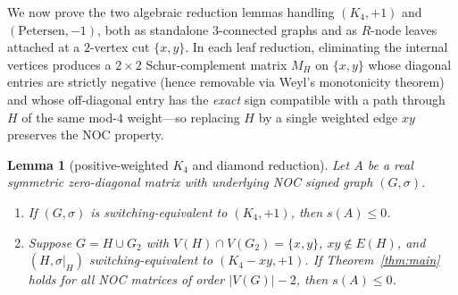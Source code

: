 \documentclass[10pt,letterpaper]{article}
\theoremstyle{zetaplain}
\newtheorem{lemma}[theorem]{Lemma}
\theoremstyle{zetadef}
\theoremstyle{remark}
\numberwithin{equation}{section}
\begin{document}
We now prove the two algebraic reduction lemmas handling $(K_4, +1)$ and $(\mathrm{Petersen}, -1)$, both as standalone $3$-connected graphs and as $R$-node leaves attached at a $2$-vertex cut $\{x, y\}$. In each leaf reduction, eliminating the internal vertices produces a $2 \times 2$ Schur-complement matrix $M_H$ on $\{x, y\}$ whose diagonal entries are strictly negative (hence removable via Weyl's monotonicity theorem) and whose off-diagonal entry has the \emph{exact} sign compatible with a path through $H$ of the same mod-$4$ weight—so replacing $H$ by a single weighted edge $xy$ preserves the NOC property.

\begin{lemma}[positive-weighted $K_4$ and diamond reduction]\label{lem:K4}
Let $A$ be a real symmetric zero-diagonal matrix with underlying NOC signed graph $(G, \sigma)$.
\begin{enumerate}
  \item[(1)] If $(G, \sigma)$ is switching-equivalent to $(K_4, +1)$, then $s(A) \le 0$.
  \item[(2)] Suppose $G = H \cup G_2$ with $V(H) \cap V(G_2) = \{x, y\}$, $xy \notin E(H)$, and $(H, \sigma|_H)$ switching-equivalent to $(K_4 - xy, +1)$. If Theorem~\ref{thm:main} holds for all NOC matrices of order $|V(G)| - 2$, then $s(A) \le 0$.
\end{enumerate}
\end{lemma}
\end{document}
